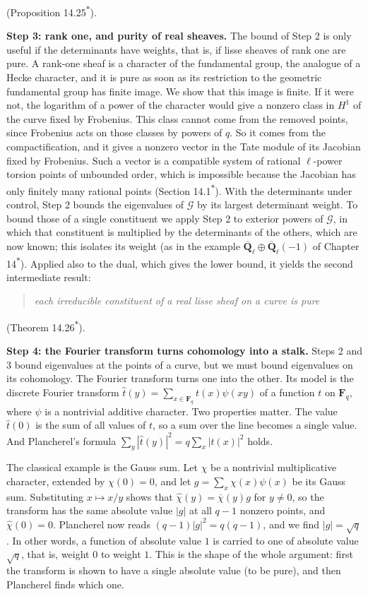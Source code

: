\documentclass[11pt]{article}
\newcommand{\bpout}[1]{#1\textsuperscript{\hyperlink{bp-outside}{\ensuremath{\ast}}}}
\begin{document}
(Proposition \bpout{14.25}).

\textbf{Step 3: rank one, and purity of real sheaves.} The bound of Step 2 is only useful if the determinants have weights, that is, if lisse sheaves of rank one are pure. A rank-one sheaf is a character of the fundamental group, the analogue of a Hecke character, and it is pure as soon as its restriction to the geometric fundamental group has finite image. We show that this image is finite. If it were not, the logarithm of a power of the character would give a nonzero class in \(H^1\) of the curve fixed by Frobenius. This class cannot come from the removed points, since Frobenius acts on those classes by powers of \(q\). So it comes from the compactification, and it gives a nonzero vector in the Tate module of its Jacobian fixed by Frobenius. Such a vector is a compatible system of rational \(\ell\)-power torsion points of unbounded order, which is impossible because the Jacobian has only finitely many rational points (Section \bpout{14.1}). With the determinants under control, Step 2 bounds the eigenvalues of \(\mathcal G\) by its largest determinant weight. To bound those of a single constituent we apply Step 2 to exterior powers of \(\mathcal G\), in which that constituent is multiplied by the determinants of the others, which are now known; this isolates its weight (as in the example \(\overline{\mathbf Q}_\ell\oplus\overline{\mathbf Q}_\ell(-1)\) of Chapter \bpout{14}). Applied also to the dual, which gives the lower bound, it yields the second intermediate result:

\begin{quote}
\emph{each irreducible constituent of a real lisse sheaf on a curve is pure}
\end{quote}

(Theorem \bpout{14.26}).

\textbf{Step 4: the Fourier transform turns cohomology into a stalk.} Steps 2 and 3 bound eigenvalues at the points of a curve, but we must bound eigenvalues on its cohomology. The Fourier transform turns one into the other. Its model is the discrete Fourier transform \(\hat t(y)=\sum_{x\in\mathbf F_q}t(x)\psi(xy)\) of a function \(t\) on \(\mathbf F_q\), where \(\psi\) is a nontrivial additive character. Two properties matter. The value \(\hat t(0)\) is the sum of all values of \(t\), so a sum over the line becomes a single value. And Plancherel's formula \(\sum_y|\hat t(y)|^2=q\sum_x|t(x)|^2\) holds.

The classical example is the Gauss sum. Let \(\chi\) be a nontrivial multiplicative character, extended by \(\chi(0)=0\), and let \(g=\sum_x\chi(x)\psi(x)\) be its Gauss sum. Substituting \(x\mapsto x/y\) shows that \(\hat\chi(y)=\overline\chi(y)g\) for \(y\neq0\), so the transform has the same absolute value \(|g|\) at all \(q-1\) nonzero points, and \(\hat\chi(0)=0\). Plancherel now reads \((q-1)|g|^2=q(q-1)\), and we find \(|g|=\sqrt q\). In other words, a function of absolute value \(1\) is carried to one of absolute value \(\sqrt q\), that is, weight \(0\) to weight \(1\). This is the shape of the whole argument: first the transform is shown to have a single absolute value (to be pure), and then Plancherel finds which one.
\end{document}
